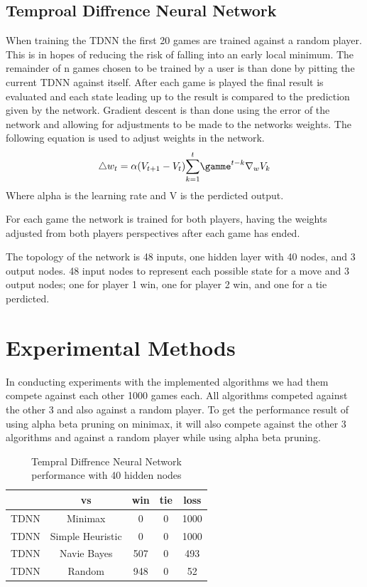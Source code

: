 \documentclass[12pt,letterpaper]{article}
\begin{document}
\subsection{Temproal Diffrence Neural Network}
When training the TDNN the first 20 games are trained against a random player. This is in hopes of reducing the risk of falling into an early local minimum. The remainder of n games chosen to be trained by a user is than done by pitting the current TDNN against itself. After each game is played the final result is evaluated and each state leading up to the result is compared to the prediction given by the network. Gradient descent is than done using the error of the network and allowing for adjustments to be made to the networks weights. The following equation is used to adjust weights in the network. 
\[
{\triangle} w_t = \alpha (V _{t + 1} - V _t)  \overset{t}{\sum_{k = 1}} {\gamme}^{t - k} {\nabla}_w V_k
\]
Where alpha is the learning rate and V is the perdicted output.

For each game the network is trained for both players, having the weights adjusted from both players perspectives after each game has ended.

The topology of the network is 48 inputs, one hidden layer with 40 nodes, and 3 output nodes. 48 input nodes to represent each possible state for a move and 3 output nodes; one for player 1 win, one for player 2 win, and one for a tie perdicted. 

\section{Experimental Methods}
In conducting experiments with the implemented algorithms we had them compete against each other 1000 games each. All algorithms competed against the other 3 and also against a random player. To get the performance result of using alpha beta pruning on minimax, it will also compete against the other 3 algorithms and against a random player while using alpha beta pruning. 


\newpage

\begin{table}
\begin{center}
\begin{tabular}{|c||c|c|c|c|}
\hline
& vs & win & tie & loss\\
\hline \hline
TDNN & Minimax & 0 & 0 & 1000\\
\hline 
TDNN & Simple Heuristic & 0 & 0 & 1000\\
\hline 
TDNN & Navie Bayes & 507 & 0 & 493\\
\hline 
TDNN & Random & 948 & 0 & 52\\
\hline 
\end{tabular}
\end{center}
\caption{Tempral Diffrence Neural Network performance with 40 hidden nodes}
\label{TDNNtable}
\end{table}
\end{document}

